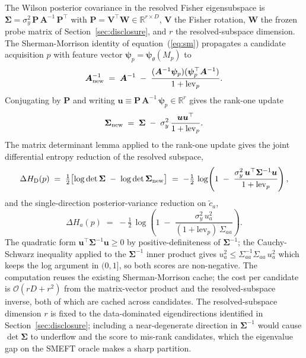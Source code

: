 \documentclass[11pt,a4paper]{article}
\newcommand{\psib}{\bm{\psi}}
\begin{document}
The Wilson posterior covariance in the resolved Fisher eigensubspace is $\bm{\Sigma} = \sigma_y^2\,\bm{P}\,\bm{A}^{-1}\,\bm{P}^\top$ with $\bm{P} = \bm{V}^\top \bm{W} \in \mathbb{R}^{r \times D}$, $\bm{V}$ the Fisher rotation, $\bm{W}$ the frozen probe matrix of Section~\ref{sec:disclosure}, and $r$ the resolved-subspace dimension. The Sherman-Morrison identity of equation~(\ref{eq:sm}) propagates a candidate acquisition $p$ with feature vector $\psib_p = \psib_\theta(M_p)$ to
\begin{equation}
  \bm{A}_{\rm new}^{-1} \;=\; \bm{A}^{-1} \;-\; \frac{(\bm{A}^{-1}\psib_p)(\psib_p^\top \bm{A}^{-1})}{1 + \mathrm{lev}_p}.
\end{equation}
Conjugating by $\bm{P}$ and writing $\bm{u} \equiv \bm{P}\,\bm{A}^{-1}\,\psib_p \in \mathbb{R}^r$ gives the rank-one update
\begin{equation}
  \bm{\Sigma}_{\rm new} \;=\; \bm{\Sigma} \;-\; \sigma_y^2\,\frac{\bm{u}\bm{u}^\top}{1 + \mathrm{lev}_p}.
\end{equation}
The matrix determinant lemma applied to the rank-one update gives the joint differential entropy reduction of the resolved subspace,
\begin{equation}
  \Delta H_{\rm D}(p) \;=\; \tfrac{1}{2}\bigl[\log\det\bm{\Sigma} \;-\; \log\det\bm{\Sigma}_{\rm new}\bigr]
  \;=\; -\tfrac{1}{2}\,\log\!\left(1 \;-\; \frac{\sigma_y^2\,\bm{u}^\top \bm{\Sigma}^{-1}\bm{u}}{1 + \mathrm{lev}_p}\right),
\end{equation}
and the single-direction posterior-variance reduction on $\tilde{c}_a$,
\begin{equation}
  \Delta H_a(p) \;=\; -\tfrac{1}{2}\,\log\!\left(1 \;-\; \frac{\sigma_y^2\,u_a^2}{(1 + \mathrm{lev}_p)\,\Sigma_{aa}}\right).
\end{equation}
The quadratic form $\bm{u}^\top \bm{\Sigma}^{-1}\bm{u} \geq 0$ by positive-definiteness of $\bm{\Sigma}^{-1}$; the Cauchy-Schwarz inequality applied to the $\bm{\Sigma}^{-1}$ inner product gives $u_a^2 \leq \Sigma_{aa}^{-1}\Sigma_{aa}\,u_a^2$ which keeps the log argument in $(0, 1]$, so both scores are non-negative. The computation reuses the existing Sherman-Morrison cache; the cost per candidate is $\mathcal{O}(rD + r^2)$ from the matrix-vector product and the resolved-subspace inverse, both of which are cached across candidates. The resolved-subspace dimension $r$ is fixed to the data-dominated eigendirections identified in Section~\ref{sec:disclosure}; including a near-degenerate direction in $\bm{\Sigma}^{-1}$ would cause $\det\bm{\Sigma}$ to underflow and the score to mis-rank candidates, which the eigenvalue gap on the SMEFT oracle makes a sharp partition.
\end{document}
